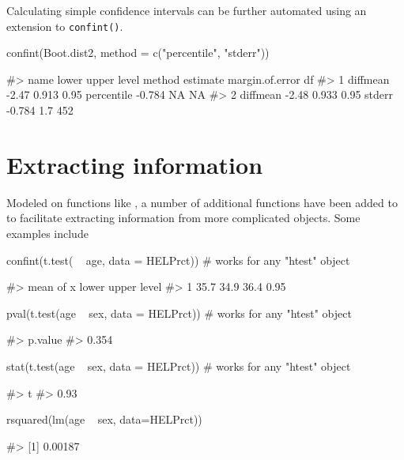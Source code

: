 Calculating simple confidence intervals can be further automated using
an extension to \texttt{confint()}.

\begin{Schunk}
\begin{Sinput}
confint(Boot.dist2, method = c("percentile", "stderr"))
\end{Sinput}
\begin{Soutput}
#>       name lower upper level     method estimate margin.of.error  df
#> 1 diffmean -2.47 0.913  0.95 percentile   -0.784              NA  NA
#> 2 diffmean -2.48 0.933  0.95     stderr   -0.784             1.7 452
\end{Soutput}
\end{Schunk}

\section{Extracting information}\label{extracting-information}

Modeled on functions like , a number of additional
functions have been added to  to facilitate extracting
information from more complicated objects. Some examples include

\begin{Schunk}
\begin{Sinput}
confint(t.test( ~ age, data = HELPrct))    # works for any "htest" object
\end{Sinput}
\begin{Soutput}
#>   mean of x lower upper level
#> 1      35.7  34.9  36.4  0.95
\end{Soutput}
\begin{Sinput}
pval(t.test(age ~ sex, data = HELPrct))    # works for any "htest" object
\end{Sinput}
\begin{Soutput}
#> p.value 
#>   0.354
\end{Soutput}
\begin{Sinput}
stat(t.test(age ~ sex, data = HELPrct))    # works for any "htest" object
\end{Sinput}
\begin{Soutput}
#>    t 
#> 0.93
\end{Soutput}
\begin{Sinput}
rsquared(lm(age ~ sex, data=HELPrct))
\end{Sinput}
\begin{Soutput}
#> [1] 0.00187
\end{Soutput}
\end{Schunk}

